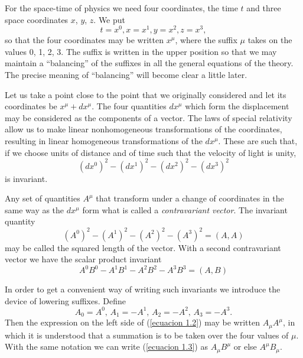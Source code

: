 For the space-time of physics we need four coordinates, the time $t$ and three 
space coordinates $x$, $y$, $z$. We put 
\[
 t = x^0, x = x^1, y = x^2, z = x^3,
\]
so that the four coordinates may be written $x^\mu$, where the suffix $\mu$ 
takes on the values 0, 1, 2, 3. The suffix is written in the upper position so 
that we may maintain a ``balancing'' of the suffixes in all the general 
equations of the theory. The precise meaning of ``balancing'' will become clear 
a little later.

Let us take a point close to the point that we originally considered and let 
its coordinates be $x^\mu + dx^\mu$. The four quantities $dx^\mu$ which form 
the displacement may be considered as the components of a vector. The laws of 
special relativity allow us to make linear nonhomogeneous transformations of the 
coordinates, resulting in linear homogeneous transformations of the $dx^\mu$. 
These are such that, if we choose units of distance and of time such that the 
velocity of light is unity,
\begin{equation}
\label{ecuacion 1.1}
   \left( dx^0 \right)^2 
 - \left( dx^1 \right)^2 
 - \left( dx^2 \right)^2 
 - \left( dx^3 \right)^2 
\end{equation}
is invariant.

Any set of quantities $A^\mu$ that transform under a change of coordinates in 
the same way as the $dx^\mu$ form what is called a \emph{contravariant vector}. 
The invariant quantity 
\begin{equation}
 \label{ecuacion 1.2}
 \left(A^0 \right)^2 -  \left(A^1 \right)^2 -  \left(A^2 \right)^2 - \left(A^3 \right)^2 = \left( A , A \right) 
\end{equation}
may be called the squared length of the vector. With a second contravariant 
vector we have the scalar product invariant
\begin{equation}
 \label{ecuacion 1.3}
 A^0 B^0  - A^1 B^1 - A^2 B^2 - A^3 B^3 = \left( A, B \right)
\end{equation}

In order to get a convenient way of writing such invariants we introduce the 
device of lowering suffixes. Define
\begin{equation}
 \label{ecuacion 1.4}
 A_0 = A^0,\, A_1 = -A^1,\, A_2 = -A^2,\, A_3 = -A^3 .
\end{equation}
Then the expression on the left side of (\ref{ecuacion 1.2}) may be written 
$A_\mu A^\mu$, in which it is understood that a summation is to be taken over 
the four values of $\mu$. With the same notation we can write (\ref{ecuacion 
1.3}) as $A_\mu B^\mu$ or else $A^\mu B_\mu$.

